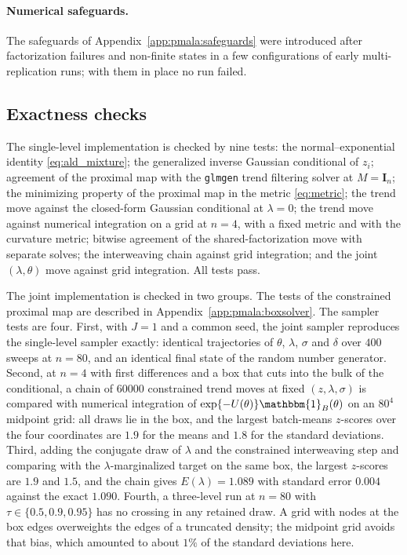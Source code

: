 \paragraph{Numerical safeguards.} The safeguards of Appendix~\ref{app:pmala:safeguards} were introduced after factorization failures and non-finite states in a few configurations of early multi-replication runs; with them in place no run failed.


\subsection{Exactness checks}
\label{app:pmala:tests}

The single-level implementation is checked by nine tests: the normal--exponential identity \eqref{eq:ald_mixture}; the generalized inverse Gaussian conditional of $z_i$; agreement of the proximal map with the \texttt{glmgen} trend filtering solver \citep{tibshirani2014adaptive} at $M = \mathbf{I}_n$; the minimizing property of the proximal map in the metric \eqref{eq:metric}; the trend move against the closed-form Gaussian conditional at $\lambda = 0$; the trend move against numerical integration on a grid at $n = 4$, with a fixed metric and with the curvature metric; bitwise agreement of the shared-factorization move with separate solves; the interweaving chain against grid integration; and the joint $(\lambda,\theta)$ move against grid integration. All tests pass.

The joint implementation is checked in two groups. The tests of the constrained proximal map are described in Appendix~\ref{app:pmala:boxsolver}. The sampler tests are four. First, with $J=1$ and a common seed, the joint sampler reproduces the single-level sampler exactly: identical trajectories of $\theta$, $\lambda$, $\sigma$ and $\delta$ over $400$ sweeps at $n = 80$, and an identical final state of the random number generator. Second, at $n=4$ with first differences and a box that cuts into the bulk of the conditional, a chain of $60000$ constrained trend moves at fixed $(z, \lambda, \sigma)$ is compared with numerical integration of $\exp\{-U(\theta)\}\mathbbm{1}_B(\theta)$ on an $80^4$ midpoint grid: all draws lie in the box, and the largest batch-means $z$-scores over the four coordinates are $1.9$ for the means and $1.8$ for the standard deviations. Third, adding the conjugate draw of $\lambda$ and the constrained interweaving step and comparing with the $\lambda$-marginalized target on the same box, the largest $z$-scores are $1.9$ and $1.5$, and the chain gives $E(\lambda) = 1.089$ with standard error $0.004$ against the exact $1.090$. Fourth, a three-level run at $n=80$ with $\tau \in \{0.5, 0.9, 0.95\}$ has no crossing in any retained draw. A grid with nodes at the box edges overweights the edges of a truncated density; the midpoint grid avoids that bias, which amounted to about $1\%$ of the standard deviations here.
